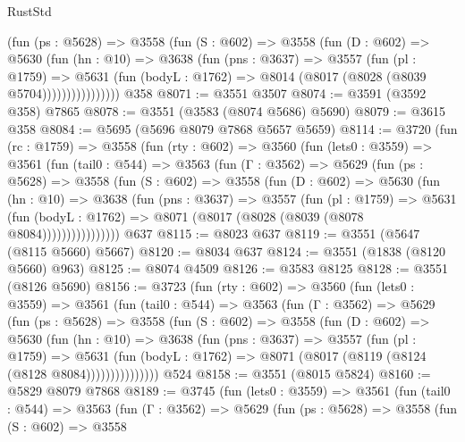 \begin{lexlean}{RustStd}
\begin{coremodule}
                (fun (ps : @5628) =>
                @3558
                  (fun (S : @602) =>
                  @3558
                    (fun (D : @602) =>
                    @5630
                      (fun (hn : @10) =>
                      @3638
                        (fun (pns : @3637) =>
                        @3557
                          (fun (pl : @1759) =>
                          @5631
                            (fun (bodyL : @1762) => @8014 (@8017 (@8028 (@8039 @5704))))))))))))))))
    @358
@8071 := @3551 @3507
@8074 := @3591 (@3592 @358) @7865
@8078 := @3551 (@3583 (@8074 @5686) @5690)
@8079 := @3615 @358
@8084 := @5695 (@5696 @8079 @7868 @5657 @5659)
@8114 := @3720
    (fun (rc : @1759) =>
    @3558
      (fun (rty : @602) =>
      @3560
        (fun (lets0 : @3559) =>
        @3561
          (fun (tail0 : @544) =>
          @3563
            (fun (Γ : @3562) =>
            @5629
              (fun (ps : @5628) =>
              @3558
                (fun (S : @602) =>
                @3558
                  (fun (D : @602) =>
                  @5630
                    (fun (hn : @10) =>
                    @3638
                      (fun (pns : @3637) =>
                      @3557
                        (fun (pl : @1759) =>
                        @5631
                          (fun (bodyL : @1762) =>
                          @8071 (@8017 (@8028 (@8039 (@8078 @8084))))))))))))))))
    @637
@8115 := @8023 @637
@8119 := @3551 (@5647 (@8115 @5660) @5667)
@8120 := @8034 @637
@8124 := @3551 (@1838 (@8120 @5660) @963)
@8125 := @8074 @4509
@8126 := @3583 @8125
@8128 := @3551 (@8126 @5690)
@8156 := @3723
    (fun (rty : @602) =>
    @3560
      (fun (lets0 : @3559) =>
      @3561
        (fun (tail0 : @544) =>
        @3563
          (fun (Γ : @3562) =>
          @5629
            (fun (ps : @5628) =>
            @3558
              (fun (S : @602) =>
              @3558
                (fun (D : @602) =>
                @5630
                  (fun (hn : @10) =>
                  @3638
                    (fun (pns : @3637) =>
                    @3557
                      (fun (pl : @1759) =>
                      @5631
                        (fun (bodyL : @1762) =>
                        @8071 (@8017 (@8119 (@8124 (@8128 @8084)))))))))))))))
    @524
@8158 := @3551 (@8015 @5824)
@8160 := @5829 @8079 @7868
@8189 := @3745
    (fun (lets0 : @3559) =>
    @3561
      (fun (tail0 : @544) =>
      @3563
        (fun (Γ : @3562) =>
        @5629
          (fun (ps : @5628) =>
          @3558
            (fun (S : @602) =>
            @3558

\end{coremodule}
\end{lexlean}
